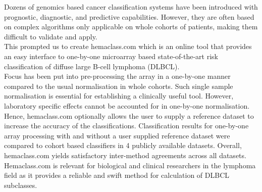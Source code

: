 \documentclass[10pt]{bmc_article}
\newenvironment{bmcformat}{\fussy\setboolean{publ}{true}}{\fussy}
\begin{document}
\begin{bmcformat}

\noindent\makebox[\linewidth]{\rule{\textwidth}{0.4pt}}\smallskip

Dozens of genomics based cancer classification systems have been introduced with prognostic, diagnostic, and predictive capabilities. However, they are often based on complex algorithms only applicable on whole cohorts of patients, making them difficult to validate and apply.\\

This prompted us to create hemaclass.com which is an online tool that provides an easy interface to one-by-one microarray based state-of-the-art risk classification of diffuse large B-cell lymphoma (DLBCL).\\

Focus has been put into pre-processing the array in a one-by-one manner compared to the usual normalisation in whole cohorts. Such single sample normalisation is essential for establishing a clinically useful tool. However, laboratory specific effects cannot be accounted for in one-by-one normalisation. Hence, hemaclass.com optionally allows the user to supply a reference dataset to increase the accuracy of the classifications. Classification results for one-by-one array processing with and without a user supplied reference dataset were compared to cohort based classifiers in 4 publicly available datasets. Overall, hemaclass.com yields satisfactory inter-method agreements across all datasets.\\

Hemaclass.com is relevant for biological and clinical researchers in the lymphoma field as it provides a reliable and swift method for calculation of DLBCL subclasses.\smallskip

\noindent\makebox[\linewidth]{\rule{\textwidth}{0.4pt}}



\end{bmcformat}
\end{document}
